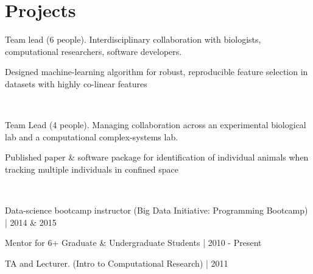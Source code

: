 \documentclass[]{winter-resume-openfont}
\begin{document}
\begin{minipage}[t]{0.65\textwidth}


\section{Projects}

\vspace{\topsep}
\begin{tightemize}
\item Team lead (6 people). Interdisciplinary collaboration with biologists, computational researchers, software developers.
\item Designed machine-learning algorithm for robust, reproducible feature selection in datasets with highly co-linear features
\end{tightemize}

\vspace{\topsep} %

 \\
\begin{tightemize}
\item Team Lead (4 people). Managing collaboration across an experimental biological lab and a computational complex-systems lab.
\item  Published paper \& software package for identification of individual animals when tracking multiple individuals in confined space
\end{tightemize}

\sectionsep

 \\
\begin{tightemize}
\item Data-science bootcamp instructor (Big Data Initiative: Programming Bootcamp) | 2014 \& 2015
\item Mentor for 6+ Graduate \& Undergraduate Students | 2010 - Present
\item TA and Lecturer. (Intro to Computational Research) | 2011
\end{tightemize}


\end{minipage}
\end{document}
